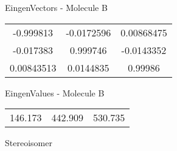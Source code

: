 \begin{multicols}{2}
\begin{center}
\vtab
 EingenVectors - Molecule B     \\
\vtab
\begin{tabular}{|c c c|}
-0.999813	 & 	-0.0172596	 & 	0.00868475	 \\
-0.017383	 & 	0.999746	 & 	-0.0143352	 \\
0.00843513	 & 	0.0144835	 & 	0.99986
\end{tabular}

\vtab
 EingenValues - Molecule B     \\
\vtab
\begin{tabular}{|c c c|}
146.173	 & 	442.909	 & 	530.735	 \\
\end{tabular}

\end{center}
\end{multicols}
\begin{center}
\vtab
\vtab
\textcolor{NavyBlue}{\Large Stereoisomer}
\end{center}

 \newpage
